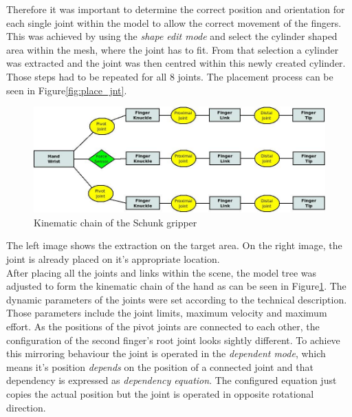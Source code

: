 Therefore it was important to determine the correct position and orientation for each single joint within the model to allow the correct movement of the fingers. This was achieved by using the \emph{shape edit mode} and select the cylinder shaped area within the mesh, where the joint has to fit. From that selection a cylinder was extracted and the joint was then centred within this newly created cylinder. Those steps had to be repeated for all 8 joints. The placement process can be seen in Figure\ref{fig:place_jnt}.

\begin{figure}[b]
	\centering
  	\includegraphics[width=1.0\textwidth]{images/hand_tree.jpg}
	\caption{Kinematic chain of the Schunk gripper}
	\label{fig:hand_tree}
\end{figure}

The left image shows the extraction on the target area. On the right image, the joint is already placed on it's appropriate location.\\

After placing all the joints and links within the scene, the model tree was adjusted to form the kinematic chain of the hand as can be seen in Figure\ref{fig:hand_tree}. The dynamic parameters of the joints were set according to the technical description. Those parameters include the joint limits, maximum velocity and maximum effort. As the positions of the pivot joints are connected to each other, the configuration of the second finger's root joint looks sightly different. To achieve this mirroring behaviour the joint is operated in the \emph{dependent mode}, which means it's position \emph{depends} on the position of a connected joint and that dependency is expressed as \emph{dependency equation}. The configured equation just copies the actual position but the joint is operated in opposite rotational direction.\\

